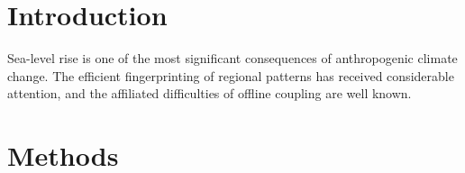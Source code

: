\documentclass[10pt,twocolumn]{article}
\begin{document}
\section{Introduction}
Sea-level rise is one of the most significant consequences of anthropogenic climate change. The efficient fingerprinting of regional patterns has received considerable attention, and the affiliated difficulties of offline coupling are well known.
\lipsum[1-9]
\section{Methods}
\lipsum[10-14]
\end{document}
